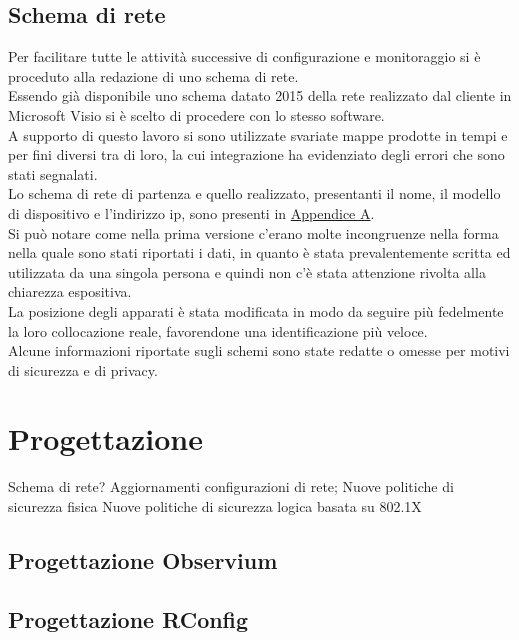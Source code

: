 \documentclass[Tesi.tex]{subfiles}
\begin{document}
\subsection{Schema di rete}
Per facilitare tutte le attività successive di configurazione e monitoraggio si è proceduto alla redazione di uno schema di rete. \\
Essendo già disponibile uno schema datato 2015 della rete realizzato dal cliente in Microsoft Visio si è scelto di procedere con lo stesso software. \\
A supporto di questo lavoro si sono utilizzate svariate mappe prodotte in tempi e per fini diversi tra di loro, la cui integrazione ha evidenziato degli errori che sono stati segnalati. \\
Lo schema di rete di partenza e quello realizzato, presentanti il nome, il modello di dispositivo e l'indirizzo ip, sono presenti in \hyperref[sec:Appendice A]{Appendice A}.\\
Si può notare come nella prima versione c'erano molte incongruenze nella forma nella quale sono stati riportati i dati, in quanto è stata prevalentemente scritta ed utilizzata da una singola persona e quindi non c'è stata attenzione rivolta alla chiarezza espositiva. \\
La posizione degli apparati è stata modificata in modo da seguire più fedelmente la loro collocazione reale, favorendone una identificazione più veloce. \\
Alcune informazioni riportate sugli schemi sono state redatte o omesse per motivi di sicurezza e di privacy. \\

\newpage
\section{Progettazione}

Schema di rete? 
Aggiornamenti configurazioni di rete;
Nuove politiche di sicurezza fisica
Nuove politiche di sicurezza logica basata su 802.1X
\subsection{Progettazione Observium}

\subsection{Progettazione RConfig}
\end{document}
